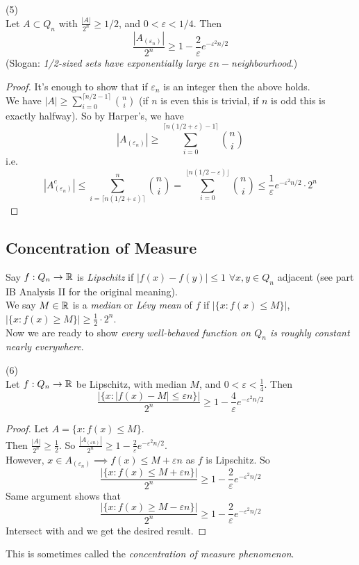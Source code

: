 \documentclass[a4paper]{article}
\begin{document}
\begin{thm} (5)\\
    Let $A \subset Q_n$ with $\frac{|A|}{2^n} \geq 1/2$, and $0 < \varepsilon < 1/4$. Then
    $$\frac{|A_{(\varepsilon_n)}|}{2^n} \geq 1-\frac{2}{\varepsilon} e^{-\varepsilon^2 n/2}$$
    (Slogan: \emph{1/2-sized sets have exponentially large $\varepsilon n-$neighbourhood}.)
    \begin{proof}
        It's enough to show that if $\varepsilon_n$ is an integer then the above holds.\\
        We have $|A| \geq \sum_{i=0}^{\lceil n/2-1\rceil} {n\choose i}$ (if $n$ is even this is trivial, if $n$ is odd this is exactly halfway). So by Harper's, we have
        $$|A_{(\varepsilon_n)}| \geq \sum_{i=0}^{\lceil n(1/2+\varepsilon)-1\rceil} {n \choose i}$$
        i.e. 
        $$|A_{(\varepsilon_n)}^c| \leq \sum_{i=\lceil n(1/2+\varepsilon)\rceil}^n {n \choose i} = \sum_{i=0}^{\lfloor n(1/2-\varepsilon)\rfloor} {n \choose i} \leq \frac{1}{\varepsilon} e^{-\varepsilon^2 n/2} \cdot 2^n$$

    \end{proof}
\end{thm}

\subsection{Concentration of Measure}

Say $f:Q_n \to \mathbb{R}$ is \emph{Lipschitz} if $|f(x)-f(y)| \leq 1$ $\forall x,y \in Q_n$ adjacent (see part IB Analysis II for the original meaning).\\
We say $M \in \mathbb{R}$ is a \emph{median} or \emph{L\'evy mean} of $f$ if $|\{x:f(x) \leq M\}|$, $|\{x:f(x) \geq M\}| \geq \frac{1}{2}\cdot 2^n$.\\
Now we are ready to show \emph{every well-behaved function on $Q_n$ is roughly constant nearly everywhere}.

\begin{thm} (6)\\
    Let $f:Q_n \to \mathbb{R}$ be Lipschitz, with median $M$, and $0<\varepsilon<\frac{1}{4}$. Then
    $$\frac{|\{x:|f(x)-M| \leq \varepsilon n\}|}{2^n} \geq 1-\frac{4}{\varepsilon} e^{-\varepsilon^2 n/2}$$
    \begin{proof}
        Let $A=\{x:f(x) \leq M\}$.\\
        Then $\frac{|A|}{2^n} \geq \frac{1}{2}$. So $\frac{|A_{(\varepsilon n)}|}{2^n} \geq 1-\frac{2}{\varepsilon} e^{-\varepsilon^2 n/2}$.\\
        However, $x \in A_{(\varepsilon_n)} \implies f(x) \leq M+\varepsilon n$ as $f$ is Lipschitz. So 
        $$\frac{|\{x:f(x) \leq M+\varepsilon n\}|}{2^n} \geq 1-\frac{2}{\varepsilon} e^{-\varepsilon^2 n/2}$$
        Same argument shows that
        $$\frac{|\{x:f(x) \geq M-\varepsilon n\}|}{2^n} \geq 1-\frac{2}{\varepsilon} e^{-\varepsilon^2 n/2}$$
        Intersect with and we get the desired result.
    \end{proof}
    This is sometimes called the \emph{concentration of measure phenomenon}.
\end{thm}
\end{document}
